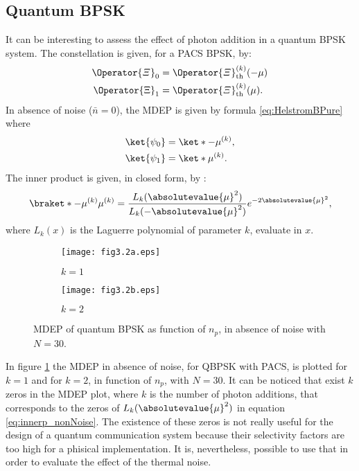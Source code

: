     \subsection{Quantum BPSK}
    It can be interesting to assess the effect of photon addition in a quantum BPSK system.
    The constellation is given, for a PACS BPSK, by:
    \begin{subequations}\begin{align}
        \Operator{\varXi}_0 &=  \Operator{\varXi}_{\mathrm{th}}^{(k)}(-\mu)\\
        \Operator{\Xi}_1 &=  \Operator{\varXi}_{\mathrm{th}}^{(k)}(\mu).
    \end{align}\end{subequations}
    In absence of noise ($\bar{n}=0$), the MDEP is given by formula \ref{eq:HelstromBPure} where
    \begin{subequations}
        \begin{align}
            \ket{\psi_0}&=\ket*{-\mu^{(k)}},\\
            \ket{\psi_1}&=\ket*{\mu^{(k)}}.
        \end{align}
    \end{subequations}
    The inner product is given, in closed form, by \cite{PACSDisc}:
    \begin{equation}
        \braket*{-\mu^{(k)}}{\mu^{(k)}} = \frac{L_k(\absolutevalue{\mu}^2)}{L_k(-\absolutevalue{\mu}^2)}
        e^{-2\absolutevalue{\mu}^2},
        \label{eq:innerp_nonNoise}
    \end{equation}
    where $L_k(x)$ is the Laguerre polynomial of parameter $k$, evaluate in $x$.
    \begin{figure}[t]
        \begin{subfigure}{0.5\textwidth}
            \texttt{[image: fig3.2a.eps]}
            \caption{$k=1$}
        \end{subfigure}
        \begin{subfigure}{0.5\textwidth}
            \texttt{[image: fig3.2b.eps]}
            \caption{$k=2$}
        \end{subfigure}
        \caption{MDEP of quantum BPSK as function of $n_p$, in absence of noise with $N=30$.}
        \label{fig:3.2}
    \end{figure}
    In figure \ref{fig:3.2} the MDEP in absence of noise, for QBPSK with PACS, is plotted for
    $k=1$ and for $k=2$, in function of $n_p$, with $N=30$. It can be noticed that exist $k$ zeros
    in the MDEP plot, where $k$ is the number of photon additions, that corresponds to the zeros
    of $L_k(\absolutevalue{\mu}^2)$ in equation \ref{eq:innerp_nonNoise}.
    The existence of these zeros is not really useful for the design of a quantum communication
    system because their selectivity factors are too high for a phisical implementation. It is, 
    nevertheless, possible to use that in order to evaluate the effect of the thermal noise.
    
